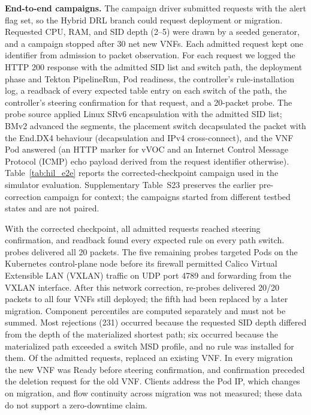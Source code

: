 \documentclass[final,5p]{elsarticle}
\newcommand{\rev}[1]{\textcolor{revisiongreen}{#1}}
\let\newrev\rev
\begin{document}


\newrev{\textbf{End-to-end campaigns.} The campaign driver submitted requests with the alert flag set, so the Hybrid DRL branch could request deployment or migration. Requested CPU, RAM, and SID depth (2--5) were drawn by a seeded generator, and a campaign stopped after 30 net new VNFs. Each admitted request kept one identifier from admission to packet observation. For each request we logged the HTTP 200 response with the admitted SID list and switch path, the deployment phase and Tekton PipelineRun, Pod readiness, the controller's rule-installation log, a readback of every expected table entry on each switch of the path, the controller's steering confirmation for that request, and a 20-packet probe. The probe source applied Linux SRv6 encapsulation with the admitted SID list; BMv2 advanced the segments, the placement switch decapsulated the packet with the End.DX4 behaviour (decapsulation and IPv4 cross-connect), and the VNF Pod answered (an HTTP marker for vVOC and an Internet Control Message Protocol (ICMP) echo payload derived from the request identifier otherwise). Table~\ref{tab:hil_e2e} reports the corrected-checkpoint campaign used in the simulator evaluation. Supplementary Table~S23 preserves the earlier pre-correction campaign for context; the campaigns started from different testbed states and are not paired.}

\newrev{With the corrected checkpoint, all \HILEtoESteered{} admitted requests reached steering confirmation, and readback found every expected rule on every path switch. \HILEtoEFullProbes{} probes delivered all 20 packets. The five remaining probes targeted Pods on the Kubernetes control-plane node before its firewall permitted Calico Virtual Extensible LAN (VXLAN) traffic on UDP port 4789 and forwarding from the VXLAN interface. After this network correction, re-probes delivered 20/20 packets to all four VNFs still deployed; the fifth had been replaced by a later migration. Component percentiles are computed separately and must not be summed. Most rejections (231) occurred because the requested SID depth differed from the depth of the materialized shortest path; six occurred because the materialized path exceeded a switch MSD profile, and no rule was installed for them. Of the admitted requests, \HILEtoEMigrations{} replaced an existing VNF. In every migration the new VNF was Ready before steering confirmation, and confirmation preceded the deletion request for the old VNF. Clients address the Pod IP, which changes on migration, and flow continuity across migration was not measured; these data do not support a zero-downtime claim.}
\end{document}
